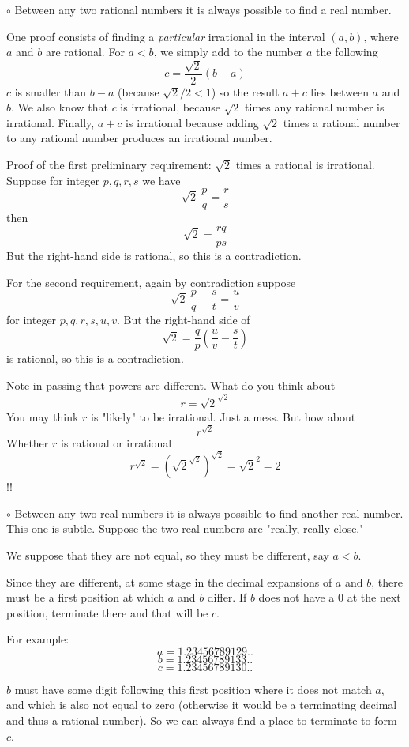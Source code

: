\documentclass[11pt, oneside]{article}
\begin{document}
$\circ$  Between any two rational numbers it is always possible to find a real number.

One proof consists of finding a \emph{particular} irrational in the interval $(a,b)$, where $a$ and $b$ are rational.  For $a < b$, we simply add to the number $a$ the following
\[ c = \frac{\sqrt{2}}{2}(b - a) \]
$c$ is smaller than $b - a$ (because $\sqrt{2}/2 < 1$) so the result $a + c$ lies between $a$ and $b$.  We also know that $c$ is irrational, because $\sqrt{2}$ times any rational number is irrational.  Finally, $a + c$ is irrational because adding $\sqrt{2}$ times a rational number to any rational number produces an irrational number.

Proof of the first preliminary requirement:  $\sqrt{2}$ times a rational is irrational.  Suppose for integer $p, q, r, s$ we have
\[ \sqrt{2} \ \frac{p}{q} = \frac{r}{s} \]
then
\[ \sqrt{2} = \frac{rq}{ps} \]
But the right-hand side is rational, so this is a contradiction.

For the second requirement, again by contradiction suppose
\[ \sqrt{2} \ \frac{p}{q} +  \frac{s}{t} = \frac{u}{v} \]
for integer $p, q, r, s, u, v$.  But the right-hand side of
\[ \sqrt{2} = \frac{q}{p} ( \frac{u}{v} - \frac{s}{t}) \]
is rational, so this is a contradiction.

Note in passing that powers are different.  What do you think about
\[ r = \sqrt{2}^{\sqrt{2}} \]
You may think $r$ is "likely" to be irrational.  Just a mess.  But how about
\[ r^{\sqrt{2}} \]
Whether $r$ is rational or irrational
\[ r^{\sqrt{2}} = (\sqrt{2}^{\sqrt{2}})^{\sqrt{2}} = \sqrt{2}^2 = 2 \]
!!

$\circ$  Between any two real numbers it is always possible to find another real number.  This one is subtle.  Suppose the two real numbers are "really, really close."  

We suppose that they are not equal, so they must be different, say $a < b$.

Since they are different, at some stage in the decimal expansions of $a$ and $b$, there must be a first position at which $a$ and $b$ differ.  If $b$ does not have a $0$ at the next position, terminate there and that will be $c$.

For example:
\[ a = 1.23456789129.. \]
\[ b = 1.23456789133.. \]
\[ c = 1.23456789130.. \]

$b$ must have some digit following this first position where it does not match $a$, and which is also not equal to zero (otherwise it would be a terminating decimal and thus a rational number).  So we can always find a place to terminate to form $c$.
\end{document}
